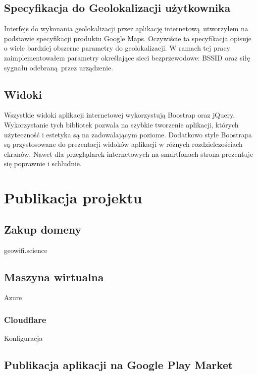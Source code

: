 
\subsection{Specyfikacja do Geolokalizacji użytkownika}
Interfejs do wykonania geolokalizacji przez aplikację internetową utworzyłem na podstawie specyfikacji produktu Google Maps.\cite{GoogleMapsGeolocationAPI} Oczywiście ta specyfikacja opisuje o wiele bardziej obszerne parametry do geolokalizacji. W ramach tej pracy zaimplementowałem parametry określające sieci bezprzewodowe: BSSID oraz siłę sygnału odebraną przez urządzenie.

\subsection{Widoki}
Wszystkie widoki aplikacji internetowej wykorzystują Boostrap oraz jQuery. Wykorzystanie tych bibliotek pozwala na szybkie tworzenie aplikacji, których użyteczność i estetyka są na zadowalającym poziome. Dodatkowo style Boostrapa są przystosowane do prezentacji widoków aplikacji w różnych rozdzielczościach ekranów. Nawet dla przeglądarek internetowych na smartfonach strona prezentuje się poprawnie i schludnie.



\section{Publikacja projektu}
\subsection{Zakup domeny}
geowifi.science
\subsection{Maszyna wirtualna}
Azure
\subsubsection{Cloudflare}
Konfiguracja
\subsection{Publikacja aplikacji na Google Play Market} %
